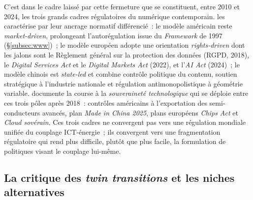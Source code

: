 %
C'est dans le cadre laissé par cette fermeture que se constituent, entre 2010 et 2024, les trois grands cadres régulatoires du numérique contemporain. \textcite{bradford_digital_2023} les caractérise par leur ancrage normatif différencié~: le modèle américain reste \emph{market-driven}, prolongeant l'autorégulation issue du \emph{Framework} de 1997 (§\ref{subsec:www})~; le modèle européen adopte une orientation \emph{rights-driven} dont les jalons sont le Règlement général sur la protection des données (RGPD, 2018), le \emph{Digital Services Act} et le \emph{Digital Markets Act} (2022), et l'\emph{AI Act} (2024)~; le modèle chinois est \emph{state-led} et combine contrôle politique du contenu, soutien stratégique à l'industrie nationale et régulation antimonopolistique à géométrie variable. \textcite{moldicz_techno_2022} documente la course à la \emph{souveraineté technologique} qui se déploie entre ces trois pôles après 2018~: contrôles américains à l'exportation des semi-conducteurs avancés, plan \emph{Made in China 2025}, plans européens \emph{Chips Act} et \emph{Cloud sovérain}. Ces trois cadres ne convergent pas vers une régulation mondiale unifiée du couplage ICT-énergie~; ils convergent vers une fragmentation régulatoire qui rend plus difficile, plutôt que plus facile, la formulation de politiques visant le couplage lui-même.


\subsection{La critique des \emph{twin transitions} et les niches alternatives}\label{subsec:critique_twin}


